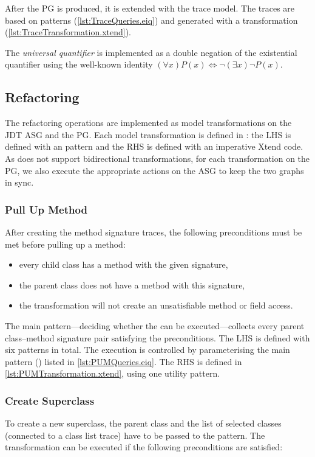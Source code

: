 \documentclass[submission,copyright,creativecommons]{eptcs}
\makeatletter
\newcommand{\pum}{\ttcsf{Pull Up Method}\@\xspace}
\makeatother
\begin{document}
After the PG is produced, it is extended with the trace model. The traces are based on \eiq patterns (\autoref{lst:TraceQueries.eiq}) and generated with a \viatra transformation (\autoref{lst:TraceTransformation.xtend}).

The \emph{universal quantifier} is implemented as a double negation of the existential quantifier using the well-known identity $(\forall x) P(x) \Leftrightarrow \neg (\exists x) \neg P(x)$.

\subsection[Refactoring]{Refactoring\qquad{}}

The refactoring operations are implemented as model transformations on the JDT ASG and the PG. Each model transformation is defined in \viatra: the LHS is defined with an \eiq pattern and the RHS is defined with an imperative Xtend code. As \viatra does not support bidirectional transformations, for each transformation on the PG, we also execute the appropriate actions on the ASG to keep the two graphs in sync.

\subsubsection{Pull Up Method}
After creating the method signature traces, the following preconditions must be met before pulling up a method:

\begin{itemize}[noitemsep]
	 \item every child class has a method with the given signature,
	 \item the parent class does not have a method with this signature,
	 \item the transformation will not create an unsatisfiable method or field access.
\end{itemize}

The main pattern---deciding whether the \pum can be executed---collects every parent class--method signature pair satisfying the preconditions. The LHS is defined with six patterns in total. The execution is controlled by parameterising the main pattern () listed in \autoref{lst:PUMQueries.eiq}. The RHS is defined in \autoref{lst:PUMTransformation.xtend}, using one utility pattern.

\subsubsection{Create Superclass}
To create a new superclass, the parent class and the list of selected classes (connected to a class list trace) have to be passed to the pattern. The transformation can be executed if the following preconditions are satisfied:
\end{document}
